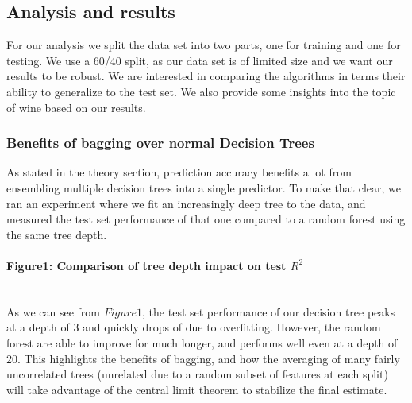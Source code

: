 \documentclass[10pt, a4paper, twocolumn]{article}
\newcommand{\myparagraph}[1]{\paragraph{#1}\mbox{}\\}
\begin{document}
	\subsection{Analysis and results}
		For our analysis we split the data set into two parts, one for training and one for testing. We use a 60/40 split, as our data set is of limited size and we want our results to be robust. We are interested in comparing the algorithms in terms their ability to generalize to the test set. We also provide some insights into the topic of wine based on our results.
		\subsubsection{Benefits of bagging over normal Decision Trees}
			As stated in the theory section, prediction accuracy benefits a lot from ensembling multiple decision trees into a single predictor. To make that clear, we ran an experiment where we fit an increasingly deep tree to the data, and measured the test set performance of that one compared to a random forest using the same tree depth.
			\myparagraph{Figure1: Comparison of tree depth impact on test $R^2$}
			As we can see from $Figure1$, the test set performance of our decision tree peaks at a depth of 3 and quickly drops of due to overfitting. However, the random forest are able to improve for much longer, and performs well even at a depth of 20. This highlights the benefits of bagging, and how the averaging of many fairly uncorrelated trees (unrelated due to a random subset of features at each split) will take advantage of the central limit theorem to stabilize the final estimate.
\end{document}
